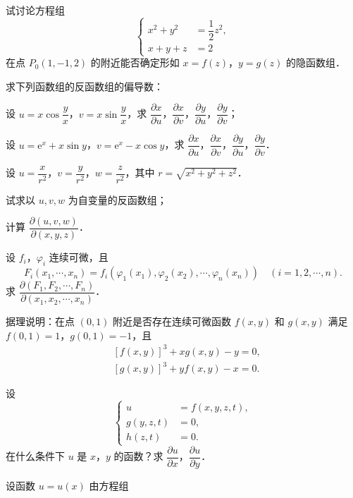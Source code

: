 \begin{xiti}
\item 试讨论方程组
\[
\left\{\begin{aligned}
x^{2}+y^{2}&=\dfrac{1}{2}z^{2},\\
x+y+z&=2
\end{aligned}\right.
\]
在点 $P_{0}(1,-1,2)$ 的附近能否确定形如 $x=f(z)$，$y=g(z)$ 的隐函数组．
\item 求下列函数组的反函数组的偏导数：
\begin{ziti}
\item 设 $u=x\cos\dfrac{y}{x}$，$v=x\sin\dfrac{y}{x}$，求 $\dfrac{\partial x}{\partial u}$，$\dfrac{\partial x}{\partial v}$，$\dfrac{\partial y}{\partial u}$，$\dfrac{\partial y}{\partial v}$；
\item 设 $u=\mathrm{e}^{x}+x\sin y$，$v=\mathrm{e}^{x}-x\cos y$，求 $\dfrac{\partial x}{\partial u}$，$\dfrac{\partial x}{\partial v}$，$\dfrac{\partial y}{\partial u}$，$\dfrac{\partial y}{\partial v}$．
\end{ziti}
\item 设 $u=\dfrac{x}{r^{2}}$，$v=\dfrac{y}{r^{2}}$，$w=\dfrac{z}{r^{2}}$，其中 $r=\sqrt{x^{2}+y^{2}+z^{2}}$．
\begin{ziti}
\item 试求以 $u,v,w$ 为自变量的反函数组；
\item 计算 $\dfrac{\partial(u,v,w)}{\partial(x,y,z)}$．
\end{ziti}
\item 设 $f_{i}$，$\varphi_{i}$ 连续可微，且
\[
F_{i}(x_{1},\cdots,x_{n})=f_{i}(\varphi_{1}(x_{1}),\varphi_{2}(x_{2}),\cdots,\varphi_{n}(x_{n}))\quad(i=1,2,\cdots,n).
\]
求 $\dfrac{\partial(F_{1},F_{2},\cdots,F_{n})}{\partial(x_{1},x_{2},\cdots,x_{n})}$．
\item 据理说明：在点 $(0,1)$ 附近是否存在连续可微函数 $f(x,y)$ 和 $g(x,y)$ 满足 $f(0,1)=1$，$g(0,1)=-1$，且
\[
\begin{aligned}
&\left[f(x,y)\right]^{3}+xg(x,y)-y=0,\\
&\left[g(x,y)\right]^{3}+yf(x,y)-x=0.
\end{aligned}
\]
\item 设
\[
\left\{\begin{aligned}
u&=f(x,y,z,t),\\
g(y,z,t)&=0,\\
h(z,t)&=0.
\end{aligned}\right.
\]
在什么条件下 $u$ 是 $x$，$y$ 的函数？求 $\dfrac{\partial u}{\partial x}$，$\dfrac{\partial u}{\partial y}$．
\item 设函数 $u=u(x)$ 由方程组

\end{xiti}
